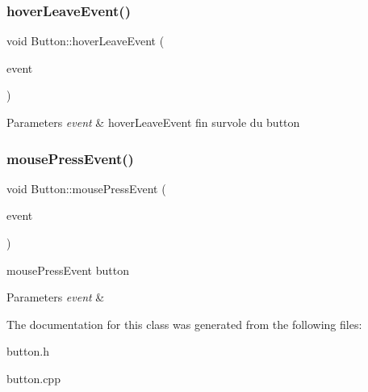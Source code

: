 \subsubsection{\texorpdfstring{hoverLeaveEvent()}{hoverLeaveEvent()}}
{\footnotesize\ttfamily void Button\+::hover\+Leave\+Event (\begin{DoxyParamCaption}\item[{Q\+Graphics\+Scene\+Hover\+Event $\ast$}]{event }\end{DoxyParamCaption})}


\begin{DoxyParams}{Parameters}
{\em event} & hover\+Leave\+Event fin survole du button \\
\hline
\end{DoxyParams}
\mbox{\label{class_button_a17d8eb0c904605b223bbc00c75655315}} 
\subsubsection{\texorpdfstring{mousePressEvent()}{mousePressEvent()}}
{\footnotesize\ttfamily void Button\+::mouse\+Press\+Event (\begin{DoxyParamCaption}\item[{Q\+Graphics\+Scene\+Mouse\+Event $\ast$}]{event }\end{DoxyParamCaption})}



mouse\+Press\+Event button 


\begin{DoxyParams}{Parameters}
{\em event} & \\
\hline
\end{DoxyParams}


The documentation for this class was generated from the following files\+:\begin{DoxyCompactItemize}
\item 
button.\+h\item 
button.\+cpp\end{DoxyCompactItemize}
